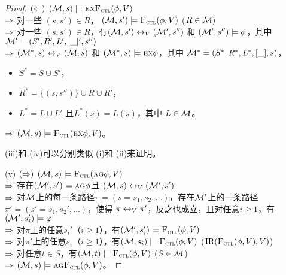 \begin{proof}
	$(\Leftarrow)$ $({\cal M},s)\models\textsc{e} \textsc{x}{\textsc{F}_{\textsc{ctl}}}(\phi,V)$\\
	$\Rightarrow$ 对一些 $(s,s')\in R$， $({\cal M},s')\models{\textsc{F}_{\textsc{ctl}}}(\phi,V)$  ($R\in {\cal M})$\\
	$\Rightarrow$ 对一些 $(s,s')\in R$，有$({\cal M},s')\leftrightarrow_V({\cal M}',s'')$ 和 $({\cal M}',s'')\models\phi$，其中 ${\cal M}'=(S',R',L',[\_]',s'')$ \\
	$\Rightarrow$ $({\cal M}^*,s)\leftrightarrow_V({\cal M},s)$ 和 $({\cal M}^*,s)\models\textsc{e}\textsc{x}\phi$，其中
	${\cal M}^*=(S^*,R^*,L^*,[\_], s)$，
	\begin{itemize}
		\item $S^*=S\cup S'$，
		\item $R^*=\{(s,s'')\}\cup R \cup R'$，
		\item $L^*= L \cup L'$ 且$L^*(s)=L(s)$，其中 $L\in{\cal M}$。
	\end{itemize}
	$\Rightarrow$ $({\cal M},s)\models {\textsc{F}_{\textsc{ctl}}}(\textsc{e}\textsc{x}\phi,V)$。
	
	
	
	
	(iii)和 (iv)可以分别类似 (i)和 (ii)来证明。
	
	(v) $(\Rightarrow)$ $({\cal M},s) \models {\textsc{F}_{\textsc{ctl}}}(\textsc{a} \textsc{g} \phi, V)$\\
	$\Rightarrow$ 存在$({\cal M}',s') \models \textsc{a} \textsc{g} \phi$且 $({\cal M},s) \leftrightarrow_V ({\cal M}',s')$\\
	$\Rightarrow$ 对${\cal M}$上的每一条路径$\pi=(s=s_1, s_2, \dots)$，存在${\cal M}'$上的一条路径$\pi'=(s'=s_1, s_2', \dots)$，使得 $\pi \leftrightarrow_V \pi'$，反之也成立，且对任意$i\geq 1$，有$({\cal M}', s_i') \models \varphi$\\ 
	$\Rightarrow$ 对$\pi$上的任意$s_i'$（$i\geq 1$），有$({\cal M}',s_i') \models {\textsc{F}_{\textsc{ctl}}}(\phi, V)$\\
	$\Rightarrow$ 对$\pi'$上的任意$s_i$（$i\geq 1$），有$({\cal M},s_i) \models {\textsc{F}_{\textsc{ctl}}}(\phi, V)$ \hfill ($\textrm{IR}({\textsc{F}_{\textsc{ctl}}}(\phi, V), V)$)\\
	$\Rightarrow$ 对任意$t \in S$，有$({\cal M},t) \models {\textsc{F}_{\textsc{ctl}}}(\phi, V)$ \hfill ($S\in {\cal M}$)\\
	$\Rightarrow$ $({\cal M},s) \models \textsc{a} \textsc{g} {\textsc{F}_{\textsc{ctl}}}(\phi, V)$。
	

\end{proof}
